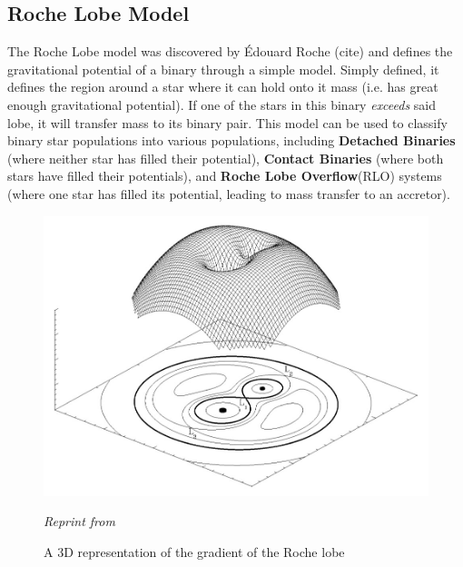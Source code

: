 \documentclass[12pt, letterpaper]{article}
\begin{document}
    \subsection{\centering Roche Lobe Model} %
        The Roche Lobe model was discovered by Édouard Roche (cite) and defines the gravitational potential of a binary through a simple model. Simply defined, it defines the region around a star where it can hold onto it mass (i.e. has great enough gravitational potential). If one of the stars in this binary \textit{exceeds} said lobe, it will transfer mass to its binary pair. This model can be used to classify binary star populations into various populations, including \textbf{Detached Binaries} (where neither star has filled their potential), \textbf{Contact Binaries} (where both stars have filled their potentials), and \textbf{Roche Lobe Overflow}(RLO) systems (where one star has filled its potential, leading to mass transfer to an accretor).
            

    \vspace*{\fill}
    \begin{figure}[h!]
        \centering
        \includegraphics[width=\textwidth]{Figs/RochePotential.jpg}
        \caption{ A 3D representation of the gradient of the Roche lobe}
        \label{fig:Roche_potential}
        \textit{\small Reprint from \cite{TaurisvandenHeuvel+2023}}
    \end{figure}
    \vspace*{\fill}
\end{document}
